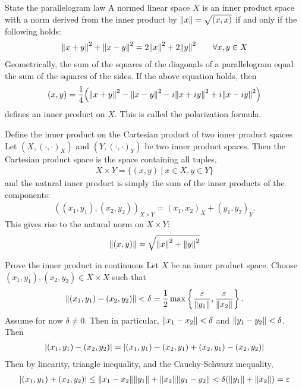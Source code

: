 \documentclass[avery5388,grid,frame]{flashcards}
\newcommand{\E}{\varepsilon}
\begin{document}
\begin{flashcard}
    {State the parallelogram law}
    A normed linear space $X$ is an inner product space with a norm derived from the inner product by $\norm{x} = \sqrt{(x,x)}$ if and only if the following holds:
    \begin{align*}
        \norm{x + y}^2 + \norm{x - y}^2 = 2\norm{x}^2 + 2\norm{y}^2 \qquad \forall x,y\in X
    \end{align*}
    Geometrically, the sum of the squares of the diagonals of a parallelogram equal the sum of the squares of the sides.  If the above equation holds, then
    \begin{align*}
        (x,y) = \frac{1}{4}\qty(\norm{x + y}^2 - \norm{x - y}^2 - i\norm{x + iy}^2 + i\norm{x - iy}^2)
    \end{align*}
    defines an inner product on $X$.  This is called the polarization formula.
\end{flashcard}

\begin{flashcard}
    {Define the inner product on the Cartesian product of two inner product spaces}
    Let $(X, (\cdot,\cdot)_X)$ and $(Y, (\cdot,\cdot)_Y)$ be two inner product spaces.  Then the Cartesian product space is the space containing all tuples,
    \begin{align*}
        X\times Y = \{(x,y)\ |\ x \in X, y \in Y\}
    \end{align*}
    and the natural inner product is simply the sum of the inner products of the components:
    \begin{align*}
        ((x_1,y_1),(x_2,y_2))_{X\times Y} = (x_1,x_2)_X + (y_1,y_2)_Y.
    \end{align*}
    This gives rise to the natural norm on $X\times Y$:
    \begin{align*}
        \norm{(x,y)} = \sqrt{\norm{x}^2 + \norm{y}^2}
    \end{align*}
\end{flashcard}

\begin{flashcard}
    {Prove the inner product in continuous}
    Let $X$ be an inner product space.  Choose $(x_1,y_1),(x_2,y_2) \in X\times X$ such that
    \begin{align*}
        \norm{(x_1,y_1) - (x_2,y_2)} < \delta = \frac{1}{2}\max\left\{\frac{\E}{\norm{y_1}},\frac{\E}{\norm{x_2}}\right\}.
    \end{align*}
    Assume for now $\delta \neq 0$.  Then in particular, $\norm{x_1 - x_2} < \delta$ and $\norm{y_1 - y_2} < \delta$.  Then
    \begin{align*}
        \abs{(x_1,y_1) - (x_2,y_2)} = \abs{(x_1,y_1) - (x_2,y_1) + (x_2,y_1) - (x_2,y_2)}
    \end{align*}
    Then by linearity, triangle inequality, and the Cauchy-Schwarz inequality,
    \begin{align*}
        \abs{(x_1, y_1) + (x_2, y_2)} \leq \norm{x_1 - x_2}\norm{y_1} + \norm{x_2}\norm{y_1 - y_2} < \delta(\norm{y_1} + \norm{x_2}) = \E
    \end{align*}
\end{flashcard}
\end{document}
